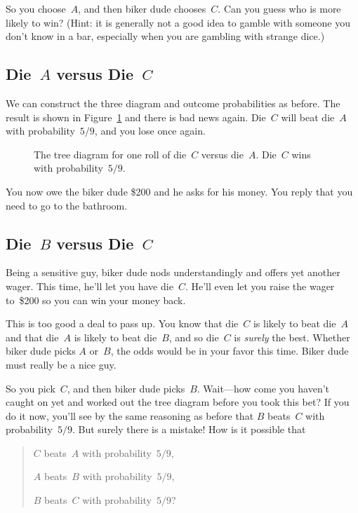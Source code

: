 So you choose~$A$, and then biker dude chooses~$C$.  Can you guess who
is more likely to win?  (Hint: it is generally not a good idea to
gamble with someone you don't know in a bar, especially when you are
gambling with strange dice.)

\subsection{Die~$A$ versus Die~$C$}

We can construct the three diagram and outcome probabilities as
before.  The result is shown in Figure~\ref{fig:14A9} and there is bad
news again.  Die~$C$ will beat die~$A$ with probability~$5/9$, and you
lose once again.

\begin{figure}


\caption{The tree diagram for one roll of die~$C$ versus die~$A$.
  Die~$C$ wins with probability~$5/9$.}

\label{fig:14A9}

\end{figure}

You now owe the biker dude \$200 and he asks for his money.  You reply
that you need to go to the bathroom.

\subsection{Die~$B$ versus Die~$C$}

Being a sensitive guy, biker dude nods understandingly and offers yet
another wager.  This time, he'll let you have die~$C$.  He'll even let
you raise the wager to~\$200 so you can win your money back.

This is too good a deal to pass up.  You know that die~$C$ is likely
to beat die~$A$ and that die~$A$ is likely to beat die~$B$, and so
die~$C$ is \emph{surely} the best.  Whether biker dude picks $A$
or~$B$, the odds would be in your favor this time.  Biker dude must
really be a nice guy.

So you pick~$C$, and then biker dude picks~$B$.  Wait---how come you
haven't caught on yet and worked out the tree diagram before you took
this bet?  If you do it now, you'll see by the same reasoning as
before that $B$ beats~$C$ with probability~$5/9$.  But surely there is
a mistake!  How is it possible that
\begin{quote}

$C$ beats~$A$ with probability~$5/9$,

$A$ beats~$B$ with probability~$5/9$,

$B$ beats~$C$ with probability~$5/9$?
\end{quote}


